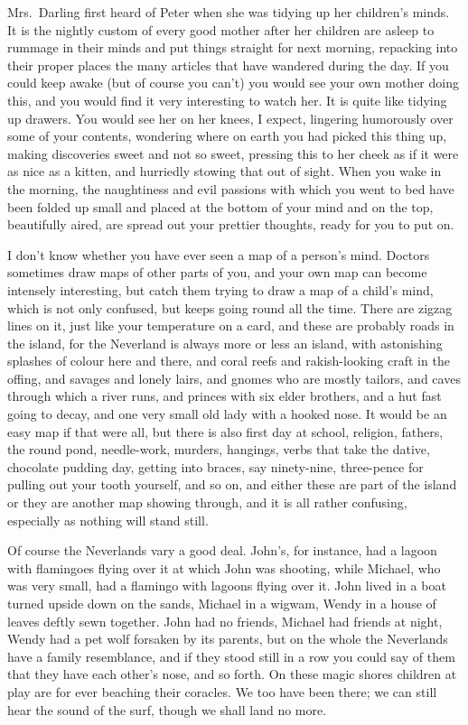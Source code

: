 Mrs.\ Darling first heard of Peter when she was tidying up her children's minds.
It is the nightly custom of every good mother after her children are asleep to
rummage in their minds and put things straight for next morning, repacking into
their proper places the many articles that have wandered during the day. If you
could keep awake (but of course you can't) you would see your own mother doing
this, and you would find it very interesting to watch her. It is quite like
tidying up drawers. You would see her on her knees, I expect, lingering
humorously over some of your contents, wondering where on earth you had picked
this thing up, making discoveries sweet and not so sweet, pressing this to her
cheek as if it were as nice as a kitten, and hurriedly stowing that out of
sight. When you wake in the morning, the naughtiness and evil passions with
which you went to bed have been folded up small and placed at the bottom of your
mind and on the top, beautifully aired, are spread out your prettier thoughts,
ready for you to put on.

I don't know whether you have ever seen a map of a person's mind. Doctors
sometimes draw maps of other parts of you, and your own map can become intensely
interesting, but catch them trying to draw a map of a child's mind, which is not
only confused, but keeps going round all the time. There are zigzag lines on it,
just like your temperature on a card, and these are probably roads in the
island, for the Neverland is always more or less an island, with astonishing
splashes of colour here and there, and coral reefs and rakish-looking craft in
the offing, and savages and lonely lairs, and gnomes who are mostly tailors, and
caves through which a river runs, and princes with six elder brothers, and a hut
fast going to decay, and one very small old lady with a hooked nose. It would be
an easy map if that were all, but there is also first day at school, religion,
fathers, the round pond, needle-work, murders, hangings, verbs that take the
dative, chocolate pudding day, getting into braces, say ninety-nine, three-pence
for pulling out your tooth yourself, and so on, and either these are part of the
island or they are another map showing through, and it is all rather confusing,
especially as nothing will stand still.

Of course the Neverlands vary a good deal. John's, for instance, had a lagoon
with flamingoes flying over it at which John was shooting, while Michael, who
was very small, had a flamingo with lagoons flying over it. John lived in a boat
turned upside down on the sands, Michael in a wigwam, Wendy in a house of leaves
deftly sewn together. John had no friends, Michael had friends at night, Wendy
had a pet wolf forsaken by its parents, but on the whole the Neverlands have a
family resemblance, and if they stood still in a row you could say of them that
they have each other's nose, and so forth. On these magic shores children at
play are for ever beaching their coracles. We too have been there; we can still
hear the sound of the surf, though we shall land no more.


